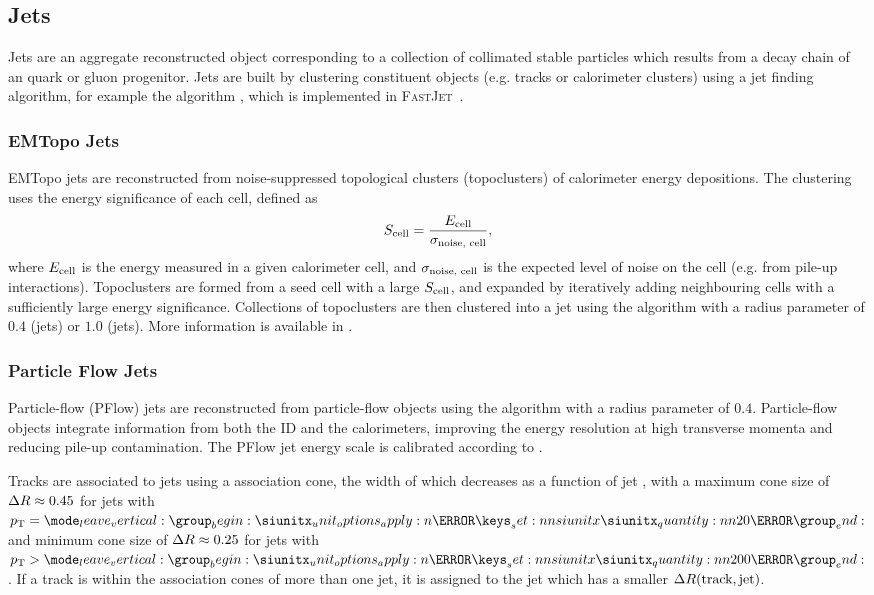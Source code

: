 \subsection{Jets}\label{sec:jet_reco}
Jets are an aggregate reconstructed object corresponding to a collection of collimated stable particles which results from a decay chain of an quark or gluon progenitor.
Jets are built by clustering constituent objects (e.g. tracks or calorimeter clusters) using a jet finding algorithm, for example the \antikt algorithm \cite{Cacciari:2008gp}, which is implemented in \textsc{FastJet}~\cite{Cacciari:2012:fastjet}.

\subsubsection{EMTopo Jets}
EMTopo jets are reconstructed from noise-suppressed topological clusters (topoclusters) of calorimeter energy depositions.
The clustering uses the energy significance of each cell, defined as 
%
\begin{equation}
  S_\textnormal{cell} = \frac{E_\textnormal{cell}}{\sigma_\textnormal{noise, cell}} ,
\end{equation}
%
where $E_\textnormal{cell}$ is the energy measured in a given calorimeter cell, and $\sigma_\textnormal{noise, cell}$ is the expected level of noise on the cell (e.g. from pile-up interactions).
Topoclusters are formed from a seed cell with a large $S_\textnormal{cell}$, and expanded by iteratively adding neighbouring cells with a sufficiently large energy significance.
Collections of topoclusters are then clustered into a jet 
using the \antikt algorithm with a radius parameter of $0.4$ (\smallR jets) or $1.0$ (\largeR jets).
More information is available in .


\subsubsection{Particle Flow Jets}
Particle-flow (PFlow) jets are reconstructed from particle-flow objects \cite{PERF-2015-09} using the \antikt algorithm with a radius parameter of $0.4$.
Particle-flow objects integrate information from both the ID and the calorimeters, improving the energy resolution at high transverse momenta and reducing pile-up contamination.
The PFlow jet energy scale is calibrated according to .

Tracks are associated to jets using a \DeltaR association cone, the width of which decreases as a function of jet \pt, with a maximum cone size of $\Delta R \approx 0.45$ for jets with $\pt = \SI{20}{\GeV}$ and minimum cone size of $\Delta R \approx 0.25$ for jets with $\pt > \SI{200}{\GeV}$. 
If a track is within the association cones of more than one jet, it is assigned to the jet which has a smaller $\Delta R(\text{track}, \text{jet})$.

